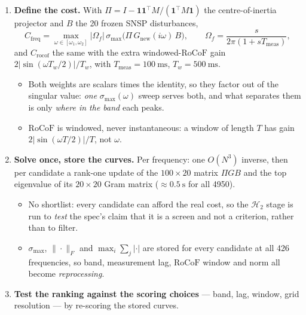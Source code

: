 \documentclass[11pt,a4paper]{article}
\newcommand{\rocof}{\ensuremath{\mathrm{RoCoF}}}
\newcommand{\Htwo}{\ensuremath{\mathcal{H}_2}}
\newcommand{\Cf}{\ensuremath{C_{\mathrm{freq}}}}
\newcommand{\Cr}{\ensuremath{C_{\mathrm{rocof}}}}
\begin{document}
\begin{enumerate}[label=\textbf{\arabic*.}]
\item \textbf{Define the cost.} With
      $\Pi = I - \mathbf{1}\mathbf{1}^{\!\top}M/(\mathbf{1}^{\!\top}M\mathbf{1})$
      the centre-of-inertia projector and $B$ the 20 frozen SNSP disturbances,
\begin{equation}
\Cf = \max_{\omega\in[\omega_1,\omega_2]}
      |\Omega_f|\,\sigma_{\max}\!\big(\Pi\,G_{\mathrm{new}}(i\omega)\,B\big),
\qquad
\Omega_f=\frac{s}{2\pi(1+sT_{\mathrm{meas}})},
\label{eq:obj}
\end{equation}
      and \Cr{} the same with the extra windowed-\rocof{} gain
      $2|\sin(\omega T_w/2)|/T_w$, with
      $T_{\mathrm{meas}}=\SI{100}{\milli\second}$, $T_w=\SI{500}{\milli\second}$.
\begin{itemize}
  \item Both weights are scalars times the identity, so they factor out of the
        singular value: \emph{one} $\sigma_{\max}(\omega)$ sweep serves both, and
        what separates them is only \emph{where in the band} each peaks.
  \item \rocof{} is windowed, never instantaneous: a window of length $T$ has
        gain $2|\sin(\omega T/2)|/T$, not $\omega$.
\end{itemize}

\item \textbf{Solve once, store the curves.} Per frequency: one $O(N^3)$
      inverse, then per candidate a rank-one update of the $100\times20$ matrix
      $\Pi GB$ and the top eigenvalue of its $20\times20$ Gram matrix
      ($\approx\SI{0.5}{\second}$ for all 4950).
\begin{itemize}
  \item No shortlist: every candidate can afford the real cost, so the \Htwo{}
        stage is run to \emph{test} the spec's claim that it is a screen and not
        a criterion, rather than to filter.
  \item $\sigma_{\max}$, $\|\cdot\|_F$ and $\max_i\sum_j|\cdot|$ are stored for
        every candidate at all 426 frequencies, so band, measurement lag,
        \rocof{} window and norm all become \emph{reprocessing}.
\end{itemize}

\item \textbf{Test the ranking against the scoring choices} --- band, lag,
      window, grid resolution --- by re-scoring the stored curves.


\end{enumerate}
\end{document}
